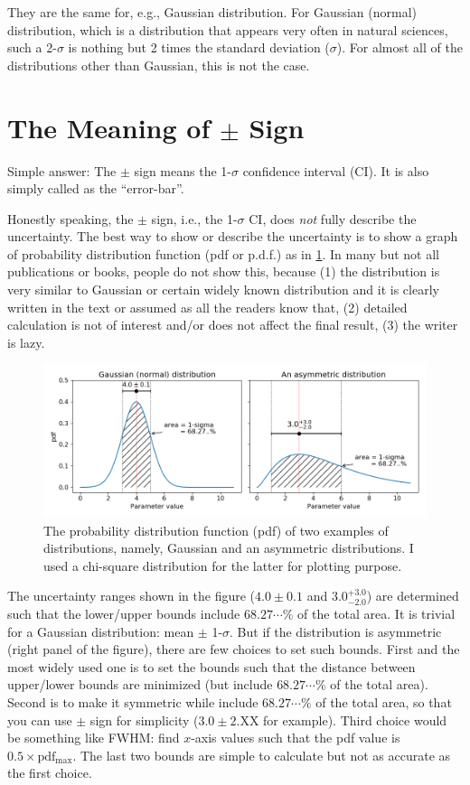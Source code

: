 They are the same for, e.g., Gaussian distribution. For Gaussian (normal) distribution, which is a distribution that appears very often in natural sciences, such a 2-$ \sigma $ is nothing but 2 times the standard deviation ($ \sigma $). For almost all of the distributions other than Gaussian, this is not the case.



\section{The Meaning of $ \pm $ Sign}
Simple answer: The $ \pm $ sign means the 1-$ \sigma $ confidence interval (CI). It is also simply called as the ``error-bar''. 

Honestly speaking, the $ \pm $ sign, i.e., the 1-$ \sigma $ CI, does \textit{not} fully describe the uncertainty. The best way to show or describe the uncertainty is to show a graph of probability distribution function (pdf or p.d.f.) as in \cref{fig:figposterior01}. In many but not all publications or books, people do not show this, because (1) the distribution is very similar to Gaussian or certain widely known distribution and it is clearly written in the text or assumed as all the readers know that, (2) detailed calculation is not of interest and/or does not affect the final result, (3) the writer is lazy. 

\begin{figure}[ht!]
\centering
\includegraphics[width=1\linewidth]{figs/fig_posterior01}
\caption{The probability distribution function (pdf) of two examples of distributions, namely, Gaussian and an asymmetric distributions. I used a chi-square distribution for the latter for plotting purpose.}
\label{fig:figposterior01}
\end{figure}


The uncertainty ranges shown in the figure ($ 4.0 \pm 0.1 $ and $ 3.0^{+3.0}_{-2.0} $) are determined such that the lower/upper bounds include $ 68.27 \cdots \% $ of the total area. It is trivial for a Gaussian distribution: mean $ \pm $ 1-$ \sigma $. But if the distribution is asymmetric (right panel of the figure), there are few choices to set such bounds. First and the most widely used one is to set the bounds such that the distance between upper/lower bounds are minimized (but include $ 68.27 \cdots \% $ of the total area). Second is to make it symmetric while include $ 68.27 \cdots \% $ of the total area, so that you can use $ \pm $ sign for simplicity ($ 3.0 \pm 2.\mathrm{XX} $ for example). Third choice would be something like FWHM: find $ x $-axis values such that the pdf value is $ 0.5 \times \mathrm{pdf_{max}} $. The last two bounds are simple to calculate but not as accurate as the first choice.

